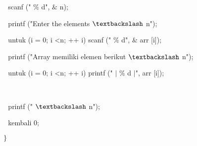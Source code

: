 \noindent 
 \hspace*{0.5in}  $  $ $  $ $  $scanf (" $  \%  $ d",  $  \&  $ n); \par
\vspace{12pt}
\noindent 
 \hspace*{0.5in}  $  $ $  $ $  $printf ("Enter the elements  $  \textbackslash  $ n"); \par
\vspace{12pt}
\noindent 
 \hspace*{0.5in}  $  $ $  $ $  $untuk (i = 0; i <n; ++ i) scanf (" $  \%  $ d",  $  \&  $ arr [i]); \par
\noindent 
 \hspace*{0.5in}  $  $ $  $ $  $printf ("Array memiliki elemen berikut  $  \textbackslash  $ n"); \par
\noindent 
 \hspace*{0.5in}  $  $ $  $ $  $untuk (i = 0; i <n; ++ i) printf (" $  \vert  $ $  \%  $ d  $  \vert  $", arr [i]); \par
\noindent 
 $  $ $  $ $  $ \par
\noindent 
 \hspace*{0.5in}  $  $ $  $ $  $printf (" $  \textbackslash  $ n"); \par
\noindent 
 \hspace*{0.5in}  $  $ $  $ $  $kembali 0; \par
\noindent 
 \hspace*{0.5in}  $  \}  $ \par
\vspace{12pt}

